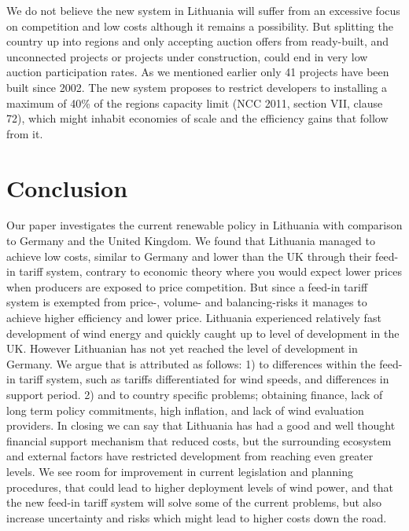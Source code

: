 \documentclass[a4paper, 12pt]{article}
\begin{document}
We do not believe the new system in Lithuania will suffer from an excessive focus on competition and low costs although it remains a possibility. But splitting the country up into regions and only accepting auction offers from ready-built, and unconnected projects or projects under construction, could end in very low auction participation rates. As we mentioned earlier only 41 projects have been built since 2002. The new system proposes to restrict developers to installing a maximum of 40\% of the regions capacity limit (NCC 2011, section VII, clause 72), which might inhabit economies of scale and the efficiency gains that follow from it.

\section{Conclusion}
Our paper investigates the current renewable policy in Lithuania with comparison to Germany and the United Kingdom. We found that Lithuania managed to achieve low costs, similar to Germany and lower than the UK through their feed-in tariff system, contrary to economic theory where you would expect lower prices when producers are exposed to price competition. But since a feed-in tariff system is exempted from price-, volume- and balancing-risks it manages to achieve higher efficiency and lower price. Lithuania experienced relatively fast development of wind energy and quickly caught up to level of development in the UK. However Lithuanian has not yet reached the level of development in Germany. We argue that is attributed as follows: 1) to differences within the feed-in tariff system, such as tariffs differentiated for wind speeds, and differences in support period. 2) and to country specific problems; obtaining finance, lack of long term policy commitments, high inflation, and lack of wind evaluation providers. In closing we can say that Lithuania has had a good and well thought financial support mechanism that reduced costs, but the surrounding ecosystem and external factors have restricted development from reaching even greater levels. We see room for improvement in current legislation and planning procedures, that could lead to higher deployment levels of wind power, and that the new feed-in tariff system will solve some of the current problems, but also increase uncertainty and risks which might lead to higher costs down the road.

\nocite{*}

\end{document}
